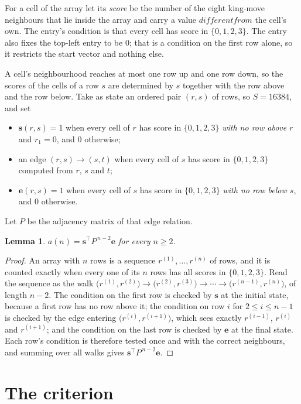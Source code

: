 \documentclass[11pt,a4paper]{article}
\theoremstyle{plain}
\newtheorem{lemma}[theorem]{Lemma}
\theoremstyle{definition}
\begin{document}
For a cell of the array let its \emph{score} be the number of the eight king-move neighbours that lie inside
the array and carry a value $different from$ the cell's own. The entry's condition is that every cell
has score in $\{0,1,2,3\}$. The entry also fixes the top-left entry to be $0$; that is a condition on the first row alone, so it restricts the start vector and nothing else.

A cell's neighbourhood reaches at most one row up and one row down, so the scores of the
cells of a row $s$ are determined by $s$ together with the row above and the row below.
Take as state an ordered pair $(r,s)$ of rows, so $S=16384$, and set
\begin{itemize}
\item $\mathbf{s}(r,s)=1$ when every cell of $r$ has score in $\{0,1,2,3\}$ \emph{with no row
above $r$} and $r_1=0$, and $0$ otherwise;
\item an edge $(r,s)\to(s,t)$ when every cell of $s$ has score in $\{0,1,2,3\}$ computed from
$r$, $s$ and $t$;
\item $\mathbf{e}(r,s)=1$ when every cell of $s$ has score in $\{0,1,2,3\}$ \emph{with no row
below $s$}, and $0$ otherwise.
\end{itemize}
Let $P$ be the adjacency matrix of that edge relation.

\begin{lemma}\label{lem:walk}
$a(n)=\mathbf{s}^{\!\top}P^{\,n-2}\mathbf{e}$ for every $n\ge2$.
\end{lemma}

\begin{proof}
An array with $n$ rows is a sequence $r^{(1)},\dots,r^{(n)}$ of rows, and it is counted
exactly when every one of its $n$ rows has all scores in $\{0,1,2,3\}$. Read the sequence as the
walk $\bigl(r^{(1)},r^{(2)}\bigr)\to\bigl(r^{(2)},r^{(3)}\bigr)\to\cdots\to
\bigl(r^{(n-1)},r^{(n)}\bigr)$, of length $n-2$. The condition on the first row is
checked by $\mathbf{s}$ at the initial state, because a first row has no row above it; the
condition on row $i$ for $2\le i\le n-1$ is checked by the edge entering
$\bigl(r^{(i)},r^{(i+1)}\bigr)$, which sees exactly $r^{(i-1)}$, $r^{(i)}$ and
$r^{(i+1)}$; and the condition on the last row is checked by $\mathbf{e}$ at the final
state. Each row's condition is therefore tested once and with the correct neighbours, and
summing over all walks gives $\mathbf{s}^{\!\top}P^{\,n-2}\mathbf{e}$.
\end{proof}

\section{The criterion}
\end{document}
